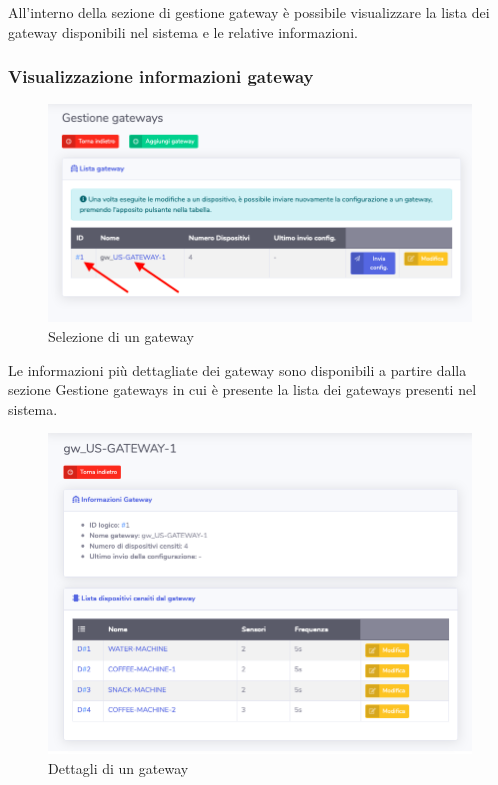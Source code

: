 		All'interno della sezione di gestione gateway è possibile visualizzare la lista dei gateway disponibili nel sistema e le relative informazioni.

	\subsubsection{Visualizzazione informazioni gateway}

		\begin{figure}[H]
		\centering
		\includegraphics[scale=0.600]{res/images/admin/selDettGateway.png}
		\caption{Selezione di un gateway}
	\end{figure}


		Le informazioni più dettagliate dei gateway sono disponibili a partire dalla sezione Gestione gateways in cui è presente la lista dei gateways presenti nel sistema.

		\begin{figure}[H]
		\centering
		\includegraphics[scale=0.600]{res/images/admin/dettGateway.png}
		\caption{Dettagli di un gateway}
	\end{figure}

